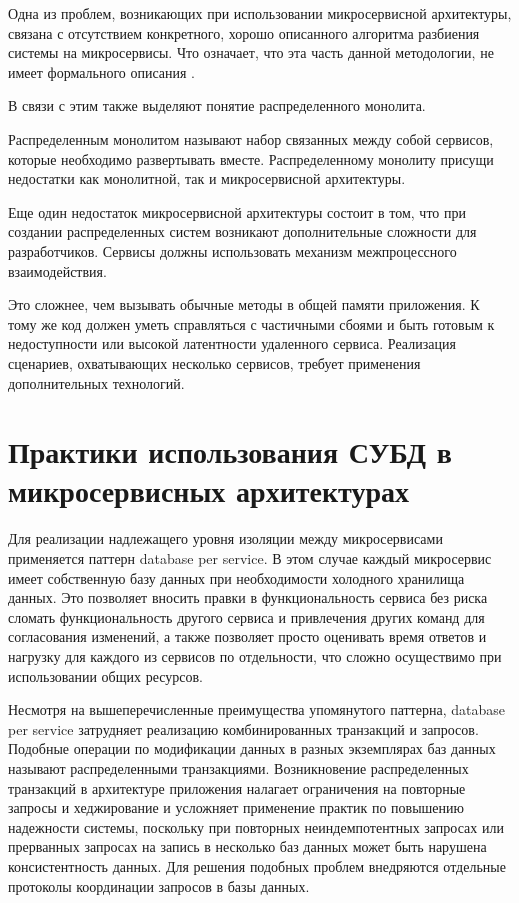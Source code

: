 Одна из проблем, возникающих при использовании микросервисной архитектуры, связана с отсутствием конкретного, хорошо описанного алгоритма разбиения
системы на микросервисы. 
Что означает, что эта часть данной методологии, не имеет формального описания \cite{micro-1}. 

В связи с этим также выделяют понятие распределенного монолита.

Распределенным монолитом называют набор связанных между собой сервисов, которые необходимо развертывать вместе. Распределенному монолиту присущи недостатки
как монолитной, так и микросервисной архитектуры.

Еще один недостаток микросервисной архитектуры состоит в том, что при создании
распределенных систем возникают дополнительные сложности для разработчиков. 
Сервисы должны использовать механизм межпроцессного взаимодействия.

Это сложнее, чем вызывать обычные методы в общей памяти приложения. 
К тому же код должен уметь
справляться с частичными сбоями и быть готовым к недоступности или высокой
латентности удаленного сервиса.
Реализация сценариев, охватывающих несколько сервисов, требует применения
дополнительных технологий. 

\section{Практики использования СУБД в микросервисных архитектурах}

Для реализации надлежащего уровня изоляции между микросервисами применяется паттерн database per service.
В этом случае каждый микросервис имеет собственную базу данных при необходимости холодного хранилища данных. 
Это позволяет вносить правки в функциональность сервиса без риска сломать функциональность другого сервиса и привлечения других команд для согласования изменений, 
а также позволяет просто оценивать время ответов и нагрузку для каждого из сервисов по отдельности, что сложно осуществимо при использовании общих ресурсов.

Несмотря на вышеперечисленные преимущества упомянутого паттерна, database per service затрудняет реализацию комбинированных транзакций и запросов. 
Подобные операции по модификации данных в разных экземплярах баз данных называют распределенными транзакциями.
Возникновение распределенных транзакций в архитектуре приложения налагает ограничения на повторные запросы и хеджирование и усложняет
применение практик по повышению надежности системы, поскольку при повторных неиндемпотентных запросах или прерванных запросах на запись в несколько баз данных
может быть нарушена консистентность данных.
Для решения подобных проблем внедряются отдельные протоколы координации запросов в базы данных.

